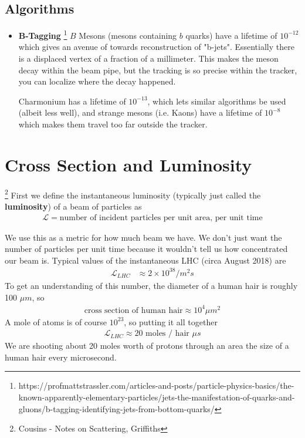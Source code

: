 \subsection{Algorithms}\label{id-aglos}
\begin{itemize}
    \item \textbf{B-Tagging} \footnote{https://profmattstrassler.com/articles-and-posts/particle-physics-basics/the-known-apparently-elementary-particles/jets-the-manifestation-of-quarks-and-gluons/b-tagging-identifying-jets-from-bottom-quarks/} $B$ Mesons (mesons containing $b$ quarks) have a lifetime of $10^{-12}$ which gives an avenue of towards reconstruction of "b-jets". Essentially there is a displaced vertex of a fraction of a millimeter. This makes the meson decay within the beam pipe, but the tracking is so precise within the tracker, you can localize where the decay happened.
    
    
    Charmonium has a lifetime of $10^{-13}$, which lets similar algorithms be used (albeit less well), and strange mesons (i.e. Kaons) have a lifetime of $10^{-8}$ which makes them travel too far outside the tracker.
    
\end{itemize}


\section{Cross Section and Luminosity}\footnote{Cousins - Notes on Scattering, Griffiths}
First we define the instantaneous luminosity (typically just called the \textbf{luminosity}) of a beam of particles as 
\begin{align}
\mathcal{L} = \textrm{number~of~incident~particles~per~unit~area,~per~unit~time}
\end{align}

We use this as a metric for how much beam we have. We don't just want the number of particles per unit time because it wouldn't tell us how concentrated our beam is.  Typical values of the instantaneous LHC (circa August 2018) are
\begin{align}
\mathcal{L}_{LHC} &\approx 2\times 10^{38} /m^2s
\end{align}
To get an understanding of this number, the diameter of a human hair is roughly  100 $\mu m$, so
\begin{align}
\textrm{cross section of human hair} \approx   10^4 \mu m^2
\end{align}
A mole of atoms is of course $10^{23}$, so putting it all together
\begin{align}
\mathcal{L}_{LHC} \approx 20 \textrm{~moles / hair~} \mu s
\end{align}
We are shooting about 20 moles worth of protons through an area the size of a human hair every microsecond.


